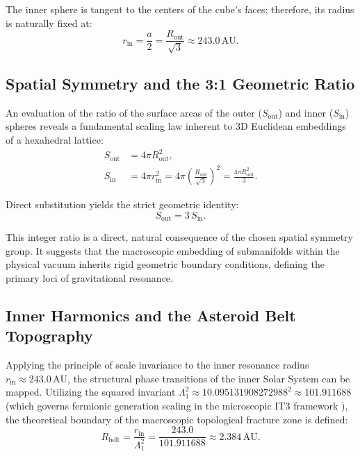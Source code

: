 \documentclass[11pt,a4paper]{article}
\theoremstyle{remark}
\newcommand{\AU}{\,\mathrm{AU}}
\newcommand{\Lone}{\Lambda_1}
\newcommand{\LoneVal}{10.095131908272988}
\begin{document}
The inner sphere is tangent to the centers of the cube's faces; therefore, its radius is naturally fixed at:
\begin{equation}
    r_{\text{in}} = \frac{a}{2} = \frac{R_{\text{out}}}{\sqrt{3}} \approx 243.0\AU.
    \label{eq:inner_radius}
\end{equation}

\subsection{Spatial Symmetry and the 3:1 Geometric Ratio}

An evaluation of the ratio of the surface areas of the outer ($S_{\text{out}}$) and inner ($S_{\text{in}}$) spheres reveals a fundamental scaling law inherent to 3D Euclidean embeddings of a hexahedral lattice:
\begin{align}
    S_{\text{out}} &= 4\pi R_{\text{out}}^2, \label{eq:s_out}\\
    S_{\text{in}}  &= 4\pi r_{\text{in}}^2 = 4\pi \left( \frac{R_{\text{out}}}{\sqrt{3}} \right)^2 = \frac{4\pi R_{\text{out}}^2}{3}. \label{eq:s_in}
\end{align}

Direct substitution yields the strict geometric identity:
\begin{equation}
    \boxed{S_{\text{out}} = 3\,S_{\text{in}}}.
    \label{eq:area_invariant}
\end{equation}

This integer ratio is a direct, natural consequence of the chosen spatial symmetry group. It suggests that the macroscopic embedding of submanifolds within the physical vacuum inherits rigid geometric boundary conditions, defining the primary loci of gravitational resonance.

\subsection{Inner Harmonics and the Asteroid Belt Topography}

Applying the principle of scale invariance to the inner resonance radius $r_{\text{in}} \approx 243.0\AU$, the structural phase transitions of the inner Solar System can be mapped. Utilizing the squared invariant $\Lone^2 \approx \LoneVal^2 \approx 101.911688$ (which governs fermionic generation scaling in the microscopic IT3 framework \cite{logvinovich2026}), the theoretical boundary of the macroscopic topological fracture zone is defined:
\begin{equation}
    R_{\text{belt}} = \frac{r_{\text{in}}}{\Lone^2} = \frac{243.0}{101.911688} \approx 2.384 \AU.
\end{equation}
\end{document}
